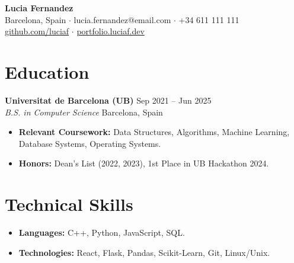 \documentclass[10pt, a4paper]{article}
\begin{document}
\pagestyle{empty}

\begin{center}
    {\Huge \textbf{Lucia Fernandez}} \\
    \vspace{0.5ex}
    Barcelona, Spain $\cdot$ lucia.fernandez@email.com $\cdot$ +34 611 111 111 \\
    \href{https://github.com/luciaf}{github.com/luciaf} $\cdot$ \href{https://portfolio.luciaf.dev}{portfolio.luciaf.dev}
\end{center}

\section*{Education}
\textbf{Universitat de Barcelona (UB)} \hfill Sep 2021 -- Jun 2025 \\
\textit{B.S. in Computer Science} \hfill Barcelona, Spain
\begin{itemize}[leftmargin=0.2in, nosep]
    \item \textbf{Relevant Coursework:} Data Structures, Algorithms, Machine Learning, Database Systems, Operating Systems.
    \item \textbf{Honors:} Dean's List (2022, 2023), 1st Place in UB Hackathon 2024.
\end{itemize}

\section*{Technical Skills}
\begin{itemize}[leftmargin=0.2in, nosep]
    \item \textbf{Languages:} C++, Python, JavaScript, SQL.
    \item \textbf{Technologies:} React, Flask, Pandas, Scikit-Learn, Git, Linux/Unix.
\end{itemize}
\end{document}
